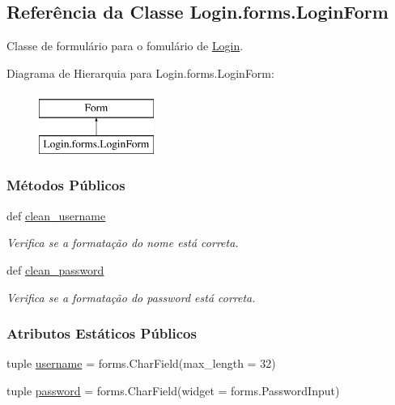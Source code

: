 \hypertarget{classLogin_1_1forms_1_1LoginForm}{\subsection{Referência da Classe Login.\-forms.\-Login\-Form}
\label{classLogin_1_1forms_1_1LoginForm}
}


Classe de formulário para o fomulário de \hyperlink{namespaceLogin}{Login}.  


Diagrama de Hierarquia para Login.\-forms.\-Login\-Form\-:\begin{figure}[H]
\begin{center}
\leavevmode
\includegraphics[height=2.000000cm]{d0/db9/classLogin_1_1forms_1_1LoginForm}
\end{center}
\end{figure}
\subsubsection*{Métodos Públicos}
\begin{DoxyCompactItemize}
\item 
def \hyperlink{classLogin_1_1forms_1_1LoginForm_a411400c2fe891080a2ccb332dd0117bf}{clean\-\_\-username}
\begin{DoxyCompactList}\small\item\em Verifica se a formatação do nome está correta. \end{DoxyCompactList}\item 
def \hyperlink{classLogin_1_1forms_1_1LoginForm_a693547dba5ad5addb8f0540711441713}{clean\-\_\-password}
\begin{DoxyCompactList}\small\item\em Verifica se a formatação do password está correta. \end{DoxyCompactList}\end{DoxyCompactItemize}
\subsubsection*{Atributos Estáticos Públicos}
\begin{DoxyCompactItemize}
\item 
tuple \hyperlink{classLogin_1_1forms_1_1LoginForm_af3766bb4ea8cabdf57ad77214b7545fd}{username} = forms.\-Char\-Field(max\-\_\-length = 32)
\item 
tuple \hyperlink{classLogin_1_1forms_1_1LoginForm_a23e321f790e9c7bfc3e9abf767826a2d}{password} = forms.\-Char\-Field(widget = forms.\-Password\-Input)
\end{DoxyCompactItemize}


